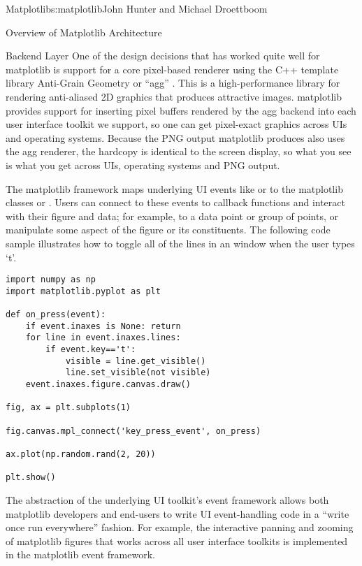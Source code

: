 \begin{aosachapter}{Matplotlib}{s:matplotlib}{John Hunter and Michael Droettboom}
\begin{aosasect1}{Overview of Matplotlib Architecture}
\begin{aosasect2}{Backend Layer}
One of the design decisions that has worked quite well for matplotlib
is support for a core pixel-based renderer using the C++ template
library Anti-Grain Geometry or ``agg'' \cite{bib:agg}.  This is a
high-performance library for rendering anti-aliased 2D graphics that
produces attractive images.  matplotlib provides support for inserting
pixel buffers rendered by the agg backend into each user interface
toolkit we support, so one can get pixel-exact graphics across UIs and
operating systems.  Because the PNG output matplotlib produces also
uses the agg renderer, the hardcopy is identical to the screen
display, so what you see is what you get across UIs, operating systems
and PNG output.

The matplotlib  framework maps underlying UI events like
 or \linebreak {} to the
matplotlib classes  or .
Users can connect to these events to callback functions and
interact with their figure and data; for example, to 
a data point or group of points, or manipulate some aspect of the 
figure or its constituents.  The following code sample illustrates
how to toggle all of the lines in an  window when the
user types `t'.


\begin{verbatim}
import numpy as np
import matplotlib.pyplot as plt

def on_press(event):
    if event.inaxes is None: return
    for line in event.inaxes.lines:
        if event.key=='t':
            visible = line.get_visible()
            line.set_visible(not visible)
    event.inaxes.figure.canvas.draw()

fig, ax = plt.subplots(1)

fig.canvas.mpl_connect('key_press_event', on_press)

ax.plot(np.random.rand(2, 20))

plt.show()
\end{verbatim}

The abstraction of the underlying UI toolkit's event framework allows
both matplotlib developers and end-users to write UI event-handling 
code in a ``write once run everywhere'' fashion. For example,
the interactive panning and zooming of matplotlib figures that works
across all user interface toolkits is implemented in the matplotlib
event framework.


\end{aosasect2}
\end{aosasect1}
\end{aosachapter}
